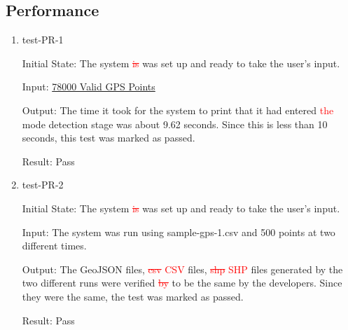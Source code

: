 \documentclass[12pt, titlepage]{article}
\begin{document}
\subsection{Performance}
\begin{enumerate}

\item{test-PR-1} \label{test-PR-1}

Initial State: The system \textcolor{red}{\sout{is}} was set up and ready to take the user's input.

Input: \href{https://github.com/paezha/PyERT-BLACK/blob/rev0-test/test/test_data/nfr-tests/pr-1.csv}{78000 Valid GPS Points}

Output: The time it took for the system to print that it had entered \textcolor{red}{the} mode detection stage was about 9.62 seconds. Since this is less than 10 seconds, this test was marked as passed.

Result: Pass

\item{test-PR-2} \label{test-PR-2}

Initial State: The system \textcolor{red}{\sout{is}} was set up and ready to take the user's input.

Input: The system was run using sample-gps-1.csv and 500 points at two different times.

Output: The GeoJSON files, \textcolor{red}{\sout{csv} CSV} files, \textcolor{red}{\sout{shp} SHP} files generated by the two different runs were verified \textcolor{red}{\sout{by}} to be the same by the developers. Since they were the same, the test was marked as passed.

Result: Pass

\end{enumerate}
\end{document}
